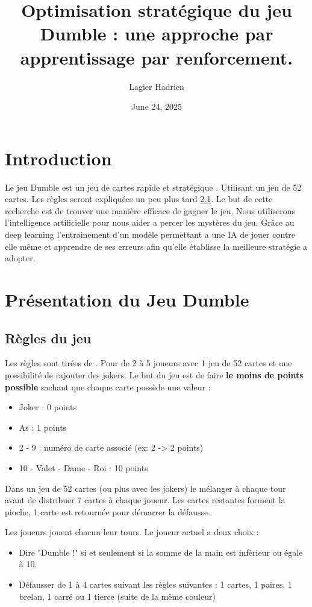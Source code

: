 \documentclass[a4paper,12pt]{article}
\title{Optimisation stratégique du jeu Dumble : une approche par apprentissage par renforcement.}
\author{Lagier Hadrien}
\date{June 24, 2025}
\begin{document}
\maketitle
\newpage
\tableofcontents
\newpage

\section{Introduction}
Le jeu Dumble est un jeu de cartes rapide et stratégique \cite{dumbleRules}. Utilisant un jeu de 52 cartes. Les règles seront expliquées un peu plus tard \ref{regle}. Le but de cette recherche est de trouver une manière efficace de gagner le jeu. Nous utiliserons l'intelligence artificielle pour nous aider a percer les mystères du jeu. Grâce au deep learning l'entrainement d'un modèle permettant a une IA de jouer contre elle même et apprendre de ses erreurs afin qu'elle établisse la meilleure stratégie a adopter.

\section{Présentation du Jeu Dumble}

\subsection{Règles du jeu}
\label{regle}

Les règles sont tirées de \cite{dumbleRules}. Pour de 2 à 5 joueurs avec 1 jeu de 52 cartes et une possibilité de rajouter des jokers. Le but du jeu est de faire \textbf{le moins de points possible} sachant que chaque carte possède une valeur :
\begin{itemize}
    \item Joker : 0 points
    \item As : 1 points
    \item 2 - 9 : numéro de carte associé (ex: 2 -> 2 points)
    \item 10 - Valet - Dame - Roi : 10 points
\end{itemize}

Dans un jeu de 52 cartes (ou plus avec les jokers) le mélanger à chaque tour avant de distribuer 7 cartes à chaque joueur. Les cartes restantes forment la pioche, 1 carte est retournée pour démarrer la défausse.

Les joueurs jouent chacun leur tours. Le joueur actuel a deux choix :

\begin{itemize}
    \item Dire "Dumble !" si et seulement si la somme de la main est infèrieur ou égale à 10.
    \item Défausser de 1 à 4 cartes suivant les règles suivantes : 1 cartes, 1 paires, 1 brelan, 1 carré ou 1 tierce (suite de la même couleur)
\end{itemize}
\end{document}
